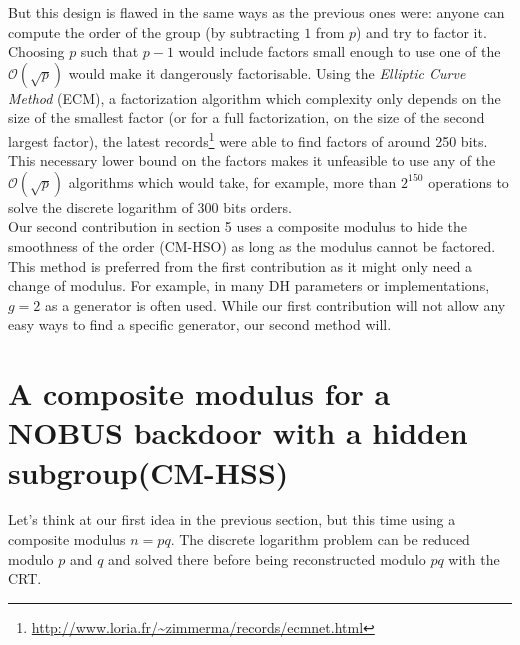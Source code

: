 \documentclass[a4paper,11pt,twocolumn]{article}
\begin{document}
But this design is flawed in the same ways as the previous ones were: anyone can compute the order of the group (by subtracting $1$ from $p$) and try to factor it. Choosing $p$ such that $p-1$ would include factors small enough to use one of the $\mathcal{O}(\sqrt{p})$ would make it dangerously factorisable. Using the \emph{Elliptic Curve Method} (ECM), a factorization algorithm which complexity only depends on the size of the smallest factor (or for a full factorization, on the size of the second largest factor), the latest records\footnote{\url{http://www.loria.fr/~zimmerma/records/ecmnet.html}} were able to find factors of around 250 bits. This necessary lower bound on the factors makes it unfeasible to use any of the $\mathcal{O}(\sqrt{p})$ algorithms which would take, for example, more than $2^{150}$ operations to solve the discrete logarithm of 300 bits orders. \\

Our second contribution in section 5 uses a composite modulus to hide the smoothness of the order (CM-HSO) as long as the modulus cannot be factored. This method is preferred from the first contribution as it might only need a change of modulus. For example, in many DH parameters or implementations, $g=2$ as a generator is often used. While our first contribution will not allow any easy ways to find a specific generator, our second method will.

\section{A composite modulus for a NOBUS backdoor with a hidden subgroup(CM-HSS)}

Let's think at our first idea in the previous section, but this time using a composite modulus $n=pq$. The discrete logarithm problem can be reduced modulo $p$ and $q$ and solved there before being reconstructed modulo $pq$ with the CRT.

\begin{center}
\end{center}
\end{document}
